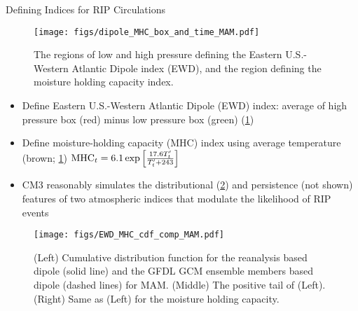 \begin{block}{Defining Indices for RIP Circulations}
  \begin{figure}[ht]
    \centerline{\texttt{[image: figs/dipole\_MHC\_box\_and\_time\_MAM.pdf]}}
    \caption{The regions of low and high pressure defining the Eastern U.S.-Western Atlantic Dipole index (EWD), and the region defining the moisture holding capacity index.}
    \label{fig:EWD-MHC-location-time}
  \end{figure}
  \begin{itemize}
    \item Define Eastern U.S.-Western Atlantic Dipole (EWD) index: average of high pressure box (red) minus low pressure box (green) (\cref{fig:EWD-MHC-location-time})
    \item Define moisture-holding capacity (MHC) index using average temperature (brown; \cref{fig:EWD-MHC-location-time})
      $\text{MHC}_t = 6.1 \exp \qty[\frac{17.6T'_{t}}{T'_{t} + 243}]$
    \item CM3 reasonably simulates the distributional (\cref{fig:cdf-comp}) and persistence (not shown) features of two atmospheric indices that modulate the likelihood of RIP events
  \end{itemize}
  \begin{figure}[ht]
    \centerline{\texttt{[image: figs/EWD\_MHC\_cdf\_comp\_MAM.pdf]}}
    \caption{
      (Left) Cumulative distribution function for the reanalysis based dipole (solid line) and the GFDL GCM ensemble members based dipole (dashed lines) for MAM.
      (Middle) The positive tail of (Left).
      (Right) Same as (Left) for the moisture holding capacity.
    }
    \label{fig:cdf-comp}
  \end{figure}
\end{block}
